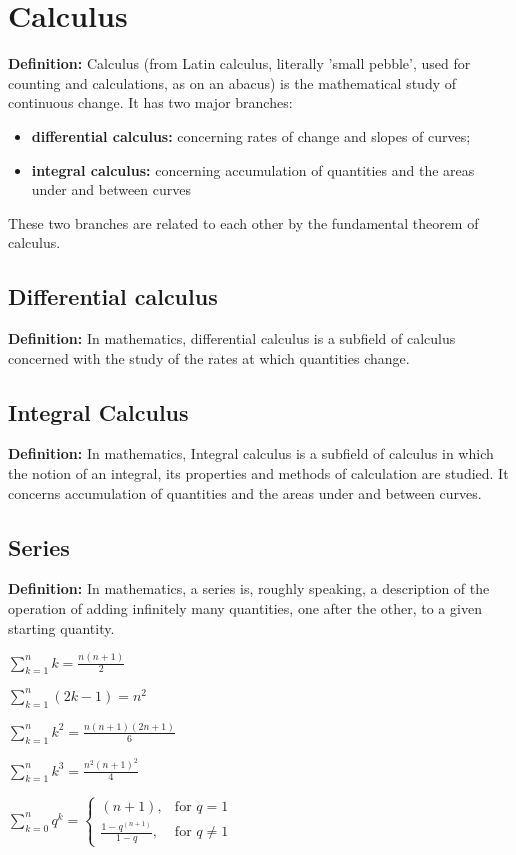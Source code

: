 \chapter{Calculus}
\textbf{Definition:} Calculus (from Latin calculus, literally 'small pebble', used for counting and calculations, as on an abacus) is the mathematical study of continuous change. It has two major branches:
\begin{itemize}  
	\item \textbf{differential calculus:} concerning rates of change and slopes of curves;
	\item \textbf{integral calculus:} concerning accumulation of quantities and the areas under and between curves
\end{itemize}
These two branches are related to each other by the fundamental theorem of calculus. 





\section{Differential calculus}
\textbf{Definition:} In mathematics, differential calculus is a subfield of calculus concerned with the study of the rates at which quantities change.





\section{Integral Calculus}
\textbf{Definition:} In mathematics, Integral calculus is a subfield of calculus in which the notion of an integral, its properties and methods of calculation are studied. It concerns accumulation of quantities and the areas under and between curves.





\section{Series}	
\textbf{Definition:} In mathematics, a series is, roughly speaking, a description of the operation of adding infinitely many quantities, one after the other, to a given starting quantity.



\begin{multicols}{3}
	
$ \sum_{k=1}^n k = \frac{n(n+1)}{2} $

$ \sum_{k=1}^n (2k-1) = n^2 $

$ \sum_{k=1}^n k^2 = \frac{n(n+1)(2n+1)}{6} $

$ \sum_{k=1}^n k^3 = \frac{n^2(n+1)^2}{4} $

$
\sum_{k=0}^{n}q^k = \begin{cases}
                         (n+1), & \text{for } q=1\\
                         \frac{1-q^{(n+1)}}{1-q}, & \text{for } q\neq1
                    \end{cases}
$
	
\end{multicols}
